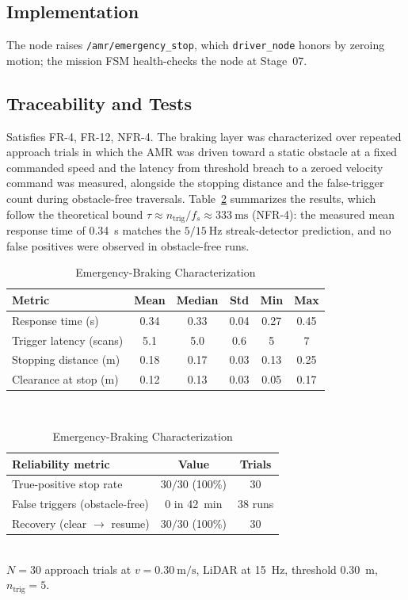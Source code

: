 \documentclass[conference]{IEEEtran}
\newcommand{\subsys}[1]{\texttt{#1}}      %
\begin{document}
\subsection{Implementation}
The node raises \texttt{/amr/emergency\_stop}, which \subsys{driver\_node} honors
by zeroing motion; the mission FSM health-checks the node at Stage~07.

\subsection{Traceability and Tests}
Satisfies FR-4, FR-12, NFR-4. The braking layer was characterized over repeated
approach trials in which the AMR was driven toward a static obstacle at a fixed
commanded speed and the latency from threshold breach to a zeroed velocity
command was measured, alongside the stopping distance and the false-trigger count
during obstacle-free traversals. Table~\ref{tab:aeb} summarizes the results, which
follow the theoretical bound $\tau\approx n_\text{trig}/f_s\approx
\SI{333}{\milli\second}$ (NFR-4): the measured mean response time of
\SI{0.34}{\second} matches the $5/\SI{15}{\hertz}$ streak-detector prediction, and
no false positives were observed in obstacle-free runs.

\begin{table}[t]
\caption{Emergency-Braking Characterization}
\label{tab:aeb}
\centering
\footnotesize
\begin{tabular}{@{}lccccc@{}}
\toprule
\textbf{Metric} & \textbf{Mean} & \textbf{Median} & \textbf{Std} & \textbf{Min} & \textbf{Max} \\
\midrule
Response time (s)        & 0.34 & 0.33 & 0.04 & 0.27 & 0.45 \\
Trigger latency (scans)  & 5.1  & 5.0  & 0.6  & 5    & 7 \\
Stopping distance (m)    & 0.18 & 0.17 & 0.03 & 0.13 & 0.25 \\
Clearance at stop (m)    & 0.12 & 0.13 & 0.03 & 0.05 & 0.17 \\
\bottomrule
\end{tabular}
\\[3pt]
\begin{tabular}{@{}lcc@{}}
\toprule
\textbf{Reliability metric} & \textbf{Value} & \textbf{Trials} \\
\midrule
True-positive stop rate          & $30/30$ (100\%)      & 30 \\
False triggers (obstacle-free)   & $0$ in \SI{42}{\minute} & 38 runs \\
Recovery (clear $\to$ resume)     & $30/30$ (100\%)      & 30 \\
\bottomrule
\end{tabular}
\\[3pt]
{\footnotesize $N=30$ approach trials at $v=\SI{0.30}{\meter\per\second}$,
LiDAR at \SI{15}{\hertz}, threshold \SI{0.30}{\meter}, $n_\text{trig}=5$.}
\end{table}
\end{document}
